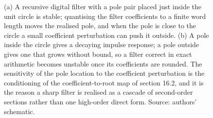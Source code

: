 \begin{figure}[ht]
\begin{tikzpicture}[x=1.0cm, y=1.0cm, font=\footnotesize]
\end{tikzpicture}
\caption[Coefficient quantisation moves an IIR filter pole across the unit
circle]{(a) A recursive digital filter with a pole pair placed just inside the
unit circle is stable; quantising the filter coefficients to a finite word
length moves the realised pole, and when the pole is close to the circle a
small coefficient perturbation can push it outside. (b) A pole inside the circle
gives a decaying impulse response; a pole outside gives one that grows without
bound, so a filter correct in exact arithmetic becomes unstable once its
coefficients are rounded. The sensitivity of the pole location to the
coefficient perturbation is the conditioning of the coefficient-to-root map of
section 16.2, and it is the reason a sharp filter is realised as a cascade of
second-order sections rather than one high-order direct form. Source: authors'
schematic.}
\label{fig:vol02ch16:iir-quantization}
\end{figure}

